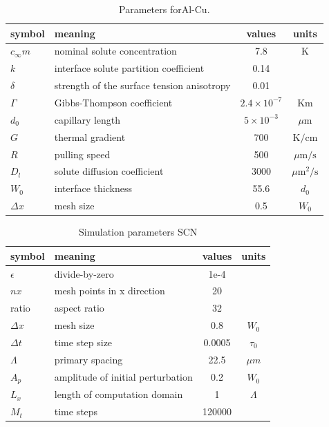 \documentclass[a4paper,12pt]{article}
\begin{document}
\begin{table}
\centering
\caption{Parameters forAl-Cu.}
\begin{tabular}{l l c c }
\toprule
symbol & meaning & values & units \\
\midrule
$c_{\infty}m$ & nominal solute concentration &  7.8 & K \\
$k$ & interface solute partition coefficient & 0.14 &\\
$\delta$ & strength of the surface tension anisotropy  &  0.01  &\\
$\Gamma$ & Gibbs-Thompson coefficient & $2.4\times 10^{-7}$ & Km \\
$d_0$ & capillary length & $ 5\times10^{-3}$  & $\mu$m \\
$G$ & thermal gradient & 700 & $\text{K} / \text{cm}$ \\
$R$ & pulling speed &  500 & $\mu \text{m} / \text{s}$ \\
$D_l$ & solute diffusion coefficient &$3000$ &  ${\mu\text{m}}^2/\text{s}$ \\
$W_0$ & interface thickness  & 55.6  & $d_0$ \\
$\Delta x$ & mesh size & 0.5 & $W_0$ \\
\bottomrule
\end{tabular}\label{tab:AlCu}

\end{table}


\begin{table}
\centering
\caption{Simulation parameters SCN}
\begin{tabular}{l l c c }
\toprule
symbol & meaning & values & units \\
\midrule
$\epsilon$ & divide-by-zero  & 1e-4  &\\
$nx$ & mesh points in x direction& 20 &\\
ratio & aspect ratio & 32 &\\
$\Delta x$ & mesh size & 0.8 & $W_0$ \\
$\Delta t$ & time step size& 0.0005& $\tau_0$ \\
$\Lambda$ & primary spacing & 22.5 & $\mu m$ \\
$A_p$ & amplitude of initial perturbation& 0.2 & $W_0$\\
$L_x$ & length of computation domain  &  1  & $\Lambda$\\
$M_t$ & time steps& 120000 & \\
\bottomrule
\end{tabular}
\end{table}
\end{document}
